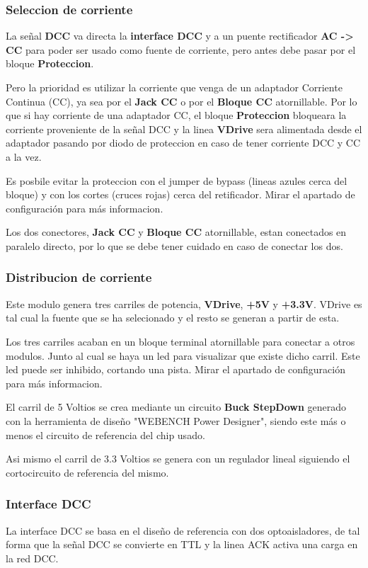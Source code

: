 \subsubsection{Seleccion de corriente}
La señal \textbf{DCC} va directa la \textbf{interface DCC} y a un puente rectificador
\textbf{AC -> CC} para poder ser usado como fuente de corriente, pero antes debe pasar
por el bloque \textbf{Proteccion}. 

Pero la prioridad es utilizar la corriente que venga de un adaptador Corriente Continua (CC), 
ya sea por el \textbf{Jack CC} o por el \textbf{Bloque CC} atornillable. 
Por lo que si hay corriente de una adaptador CC, el bloque \textbf{Proteccion} bloqueara la corriente
proveniente de la señal DCC y la linea \textbf{VDrive} sera alimentada desde el adaptador
pasando por diodo de proteccion en caso de tener corriente DCC y CC a la vez.

Es posbile evitar la proteccion con el jumper de bypass (lineas azules cerca del bloque) y
con los cortes (cruces rojas) cerca del retificador. Mirar el apartado de configuración para
más informacion.

Los dos conectores, \textbf{Jack CC} y \textbf{Bloque CC} atornillable, estan conectados
en paralelo directo, por lo que se debe tener cuidado en caso de conectar los dos.

\subsubsection{Distribucion de corriente}
Este modulo genera tres carriles de potencia, \textbf{VDrive}, \textbf{+5V} y \textbf{+3.3V}.
VDrive es tal cual la fuente que se ha selecionado y el resto se generan a partir de esta.

Los tres carriles acaban en un bloque terminal atornillable para conectar a otros modulos.
Junto al cual se haya un led para visualizar que existe dicho carril. Este led puede ser
inhibido, cortando una pista. Mirar el apartado de configuración para
más informacion.

El carril de 5 Voltios se crea mediante un circuito \textbf{Buck StepDown} generado con la herramienta
de diseño "WEBENCH Power Designer", siendo este más o menos el circuito de referencia del chip usado.

Asi mismo el carril de 3.3 Voltios se genera con un regulador lineal siguiendo el cortocircuito
de referencia del mismo.

\subsubsection{Interface DCC}
La interface DCC se basa en el diseño de referencia con dos optoaisladores, de tal forma que la
señal DCC se convierte en TTL y la linea ACK activa una carga en la red DCC.


